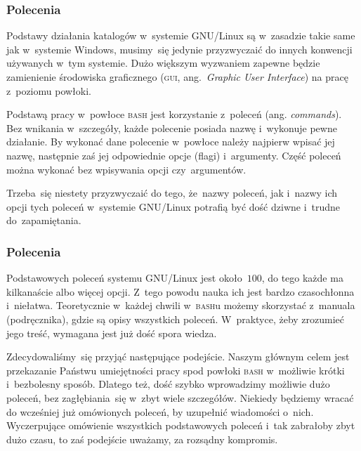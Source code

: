 \documentclass[10pt,t]{beamer}
\begin{document}
\begin{frame}
  \frametitle{Polecenia}


  Podstawy działania katalogów w~systemie GNU/Linux są w~zasadzie takie
  same jak w~systemie Windows, musimy~się jedynie przyzwyczaić do innych
  konwencji używanych w~tym systemie. Dużo większym wyzwaniem zapewne
  będzie zamienienie środowiska graficznego (\textsc{gui},
  ang.~\textit{Graphic User Interface}) na pracę z~poziomu powłoki.

  Podstawą pracy w~powłoce \textsc{bash} jest korzystanie z~poleceń (ang.
  \textit{commands}). Bez wnikania w~szczegóły, każde polecenie posiada
  nazwę i~wykonuje pewne działanie. By wykonać dane polecenie w~powłoce
  należy najpierw wpisać jej nazwę, następnie zaś jej odpowiednie
  opcje (flagi) i~argumenty. Część poleceń można wykonać bez wpisywania
  opcji czy~argumentów.

  Trzeba~się niestety przyzwyczaić do tego, że~nazwy poleceń, jak i~nazwy
  ich opcji tych poleceń w~systemie GNU/Linux potrafią być dość dziwne
  i~trudne do~zapamiętania.

\end{frame}





\begin{frame}
  \frametitle{Polecenia}


  Podstawowych poleceń systemu GNU/Linux jest około~$100$, do tego każde ma
  kilkanaście albo więcej opcji. Z~tego powodu nauka ich jest bardzo
  czasochłonna i~niełatwa. Teoretycznie w~każdej chwili w~\textsc{bash}u
  możemy skorzystać z~manuala (podręcznika), gdzie są opisy wszystkich
  poleceń. W~praktyce, żeby zrozumieć jego treść, wymagana jest już dość
  spora wiedza.

  Zdecydowaliśmy~się przyjąć następujące podejście. Naszym głównym celem
  jest przekazanie Państwu umiejętności pracy spod powłoki \textsc{bash}
  w~możliwie krótki i~bezbolesny sposób. Dlatego też, dość szybko
  wprowadzimy możliwie dużo poleceń, bez zagłębiania~się w~zbyt wiele
  szczegółów. Niekiedy będziemy wracać do wcześniej już omówionych poleceń,
  by uzupełnić wiadomości o~nich. Wyczerpujące omówienie wszystkich
  podstawowych poleceń i~tak zabrałoby zbyt dużo czasu, to zaś podejście
  uważamy, za rozsądny kompromis.

\end{frame}
\end{document}
